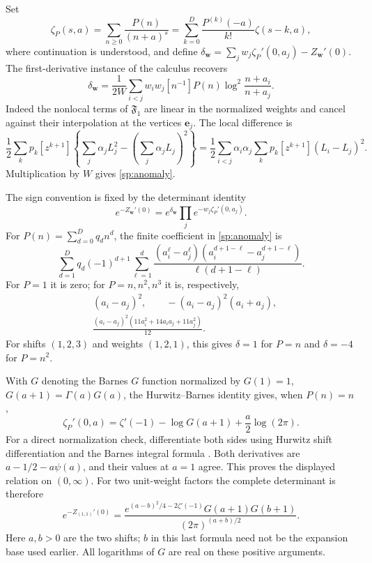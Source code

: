 \documentclass[11pt,letterpaper]{article}
\numberwithin{equation}{section}
\theoremstyle{plain}
\theoremstyle{definition}
\theoremstyle{remark}
\begin{document}
Set
\begin{equation}\label{sp:single}
 \zeta_P(s,a)=\sum_{n\ge0}\frac{P(n)}{(n+a)^s}
       =\sum_{k=0}^D\frac{P^{(k)}(-a)}{k!}\zeta(s-k,a),
\end{equation}
where continuation is understood, and define
$\delta_{\boldsymbol w}=\sum_jw_j\zeta_P'(0,a_j)
-Z_{\boldsymbol w}'(0)$. The first-derivative instance of the calculus
recovers
\begin{equation}\label{sp:anomaly}
 \boxed{\delta_{\boldsymbol w}
   =\frac1{2W}\sum_{i<j}w_iw_j[n^{-1}]P(n)
                 \log^2\frac{n+a_i}{n+a_j}.}
\end{equation}
Indeed the nonlocal terms of $\mathfrak F_1$ are linear in the
normalized weights and cancel against their interpolation at the
vertices $\boldsymbol e_j$. The local difference is
\[
 \frac12\sum_kp_k[z^{k+1}]
 \left\{\sum_j\alpha_jL_j^2-
           \left(\sum_j\alpha_jL_j\right)^2\right\}
 =\frac12\sum_{i<j}\alpha_i\alpha_j
              \sum_kp_k[z^{k+1}](L_i-L_j)^2.
\]
Multiplication by $W$ gives \eqref{sp:anomaly}.

The sign convention is fixed by the determinant identity
\begin{equation}\label{sp:determinant}
 e^{-Z_{\boldsymbol w}'(0)}
   =e^{\delta_{\boldsymbol w}}
                     \prod_j e^{-w_j\zeta_P'(0,a_j)}.
\end{equation}
For $P(n)=\sum_{d=0}^Dq_dn^d$, the finite coefficient in
\eqref{sp:anomaly} is
\begin{equation}\label{sp:pairpolynomial}
 \sum_{d=1}^Dq_d(-1)^{d+1}
   \sum_{\ell=1}^d
   \frac{(a_i^\ell-a_j^\ell)
         (a_i^{d+1-\ell}-a_j^{d+1-\ell})}{\ell(d+1-\ell)}.
\end{equation}
For $P=1$ it is zero; for $P=n,n^2,n^3$ it is, respectively,
\begin{align*}
 &(a_i-a_j)^2,\qquad -(a_i-a_j)^2(a_i+a_j),\\
 &\frac{(a_i-a_j)^2(11a_i^2+14a_ia_j+11a_j^2)}{12}.
\end{align*}
For shifts $(1,2,3)$ and weights $(1,2,1)$, this gives
$\delta=1$ for $P=n$ and $\delta=-4$ for $P=n^2$.

With $G$ denoting the Barnes $G$ function normalized by $G(1)=1$,
$G(a+1)=\Gamma(a)G(a)$, the Hurwitz--Barnes identity gives, when $P(n)=n$,
\begin{equation}\label{sp:Barnes}
 \zeta_P'(0,a)=\zeta'(-1)-\log G(a+1)+\frac a2\log(2\pi).
\end{equation}
For a direct normalization check, differentiate both sides using
Hurwitz shift differentiation and the Barnes integral formula
\cite[Eq.~5.17.4]{dlmf}. Both derivatives are
$a-1/2-a\psi(a)$, and their values at $a=1$ agree. This proves the
displayed relation on $(0,\infty)$.
For two unit-weight factors the complete determinant is therefore
\begin{equation}\label{sp:Barnesdet}
 e^{-Z_{(1,1)}'(0)}
 =\frac{e^{(a-b)^2/4-2\zeta'(-1)}G(a+1)G(b+1)}
             {(2\pi)^{(a+b)/2}}.
\end{equation}
Here $a,b>0$ are the two shifts; $b$ in this last formula need not be
the expansion base used earlier. All logarithms of $G$ are real on
these positive arguments.
\end{document}

